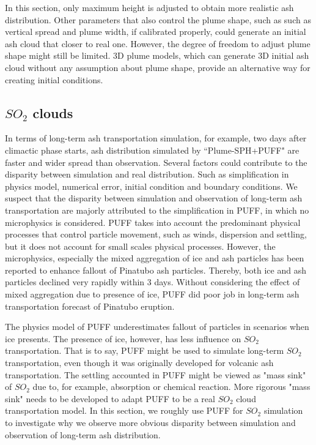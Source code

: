 In this section, only maximum height is adjusted to obtain more realistic ash distribution. Other parameters that also control the plume shape, such as such as vertical spread and plume width, if calibrated properly, could generate an initial ash cloud that closer to real one. However, the degree of freedom to adjust plume shape might still be limited. 3D plume models, which can generate 3D initial ash cloud without any assumption about plume shape, provide an alternative way for creating initial conditions.

\subsection{$SO_2$ clouds}
In terms of long-term ash transportation simulation, for example, two days after climactic phase starts, ash distribution simulated by ``Plume-SPH+PUFF" are faster and wider spread than observation. Several factors could contribute to the disparity between simulation and real distribution. Such as simplification in physics model, numerical error, initial condition and boundary conditions. We suspect that the disparity between simulation and observation of long-term ash transportation are majorly attributed to the simplification in PUFF, in which no microphysics is considered. PUFF takes into account the predominant physical processes that control particle movement, such as winds, dispersion and settling, but it does not account for small scales physical processes. However, the microphysics, especially the mixed aggregation of ice and ash particles has been reported to enhance fallout \citep{guo2004particles} of Pinatubo ash particles. Thereby, both ice and ash particles declined very rapidly within 3 days. Without considering the effect of mixed aggregation due to presence of ice, PUFF did poor job in long-term ash transportation forecast of Pinatubo eruption.

The physics model of PUFF underestimates fallout of particles in scenarios when ice presents. The presence of ice, however, has less influence on $SO_2$ transportation. That is to say, PUFF might be used to simulate long-term $SO_2$ transportation, even though it was originally developed for volcanic ash transportation. The settling accounted in PUFF might be viewed as "mass sink" of $SO_2$ due to, for example, absorption or chemical reaction. More rigorous "mass sink" needs to be developed to adapt PUFF to be a real $SO_2$ cloud transportation model. In this section, we roughly use PUFF for $SO_2$ simulation to investigate why we observe more obvious disparity between simulation and observation of long-term ash distribution. 

